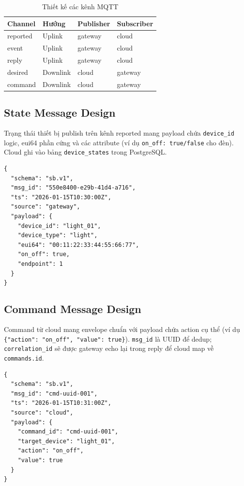 \begin{table}[H]
\centering
\caption{Thiết kế các kênh MQTT}
\label{tab:ch2-channels}
\begin{tabular}{|l|l|l|l|}
\hline
\textbf{Channel} & \textbf{Hướng} & \textbf{Publisher}
  & \textbf{Subscriber} \\ \hline
reported & Uplink & gateway & cloud \\ \hline
event & Uplink & gateway & cloud \\ \hline
reply & Uplink & gateway & cloud \\ \hline
desired & Downlink & cloud & gateway \\ \hline
command & Downlink & cloud & gateway \\ \hline
\end{tabular}
\end{table}

\subsection{State Message Design}
\label{sec:ch2-telemetry}

Trạng thái thiết bị publish trên kênh reported mang payload chứa
\texttt{device\_id} logic, eui64 phần cứng và các attribute (ví dụ
\texttt{on\_off: true/false} cho đèn). Cloud ghi vào bảng
\texttt{device\_states} trong PostgreSQL.

\begin{lstlisting}[language={}, caption={Light reported state message}]
{
  "schema": "sb.v1",
  "msg_id": "550e8400-e29b-41d4-a716",
  "ts": "2026-01-15T10:30:00Z",
  "source": "gateway",
  "payload": {
    "device_id": "light_01",
    "device_type": "light",
    "eui64": "00:11:22:33:44:55:66:77",
    "on_off": true,
    "endpoint": 1
  }
}
\end{lstlisting}

\subsection{Command Message Design}
\label{sec:ch2-commands}

Command từ cloud mang envelope chuẩn với payload chứa action cụ thể
(ví dụ \texttt{\{"action": "on\_off", "value": true\}}).
\texttt{msg\_id} là UUID để dedup; \texttt{correlation\_id} sẽ được
gateway echo lại trong reply để cloud map về
\texttt{commands.id}.

\begin{lstlisting}[language={}, caption={Command request message}]
{
  "schema": "sb.v1",
  "msg_id": "cmd-uuid-001",
  "ts": "2026-01-15T10:31:00Z",
  "source": "cloud",
  "payload": {
    "command_id": "cmd-uuid-001",
    "target_device": "light_01",
    "action": "on_off",
    "value": true
  }
}
\end{lstlisting}

